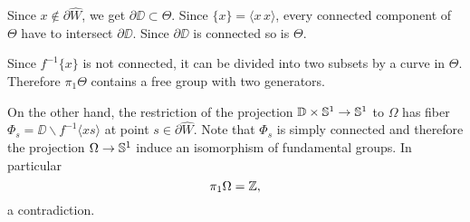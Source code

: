Since $x\notin\partial \hat W$, we get $\partial\DD\subset \Theta$.
Since $\{x\}=\langle x\,x\rangle$, every connected component of $\Theta$ have to intersect $\partial\DD$.
Since $\partial\DD$ is connected so is $\Theta$.

Since $f^{-1}\{x\}$ is not connected, it can be divided into two subsets by a curve in $\Theta$.
Therefore $\pi_1\Theta$ contains a free group with two generators.

On the other hand, the restriction of the projection $\mathbb{D}\times\mathbb{S}^1\to \mathbb{S}^1$ to $\Omega$ has fiber 
$\Phi_s=\DD\backslash f^{-1}\langle xs\rangle$ at point $s\in\partial \hat W$.
Note that $\Phi_s$ is simply connected and therefore the projection $\Omega\to \mathbb{S}^1$ induce an isomorphism of fundamental groups.
In particular 
\[\pi_1\Omega=\mathbb{Z},\]
a contradiction.
\qeds

